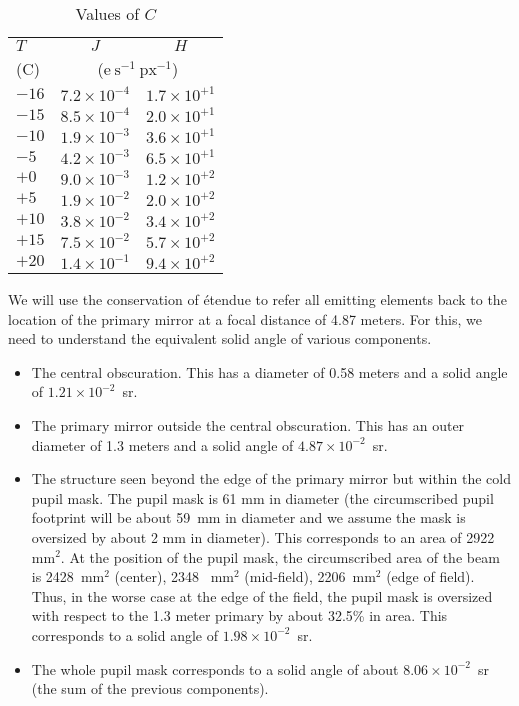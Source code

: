 \documentclass{article}
\begin{document}
\begin{table}
\caption{Values of $C$}
\label{table:C}
\medskip
\begin{center}
\begin{tabular}{lll}
\hline
\hline
$T$&\multicolumn{1}{c}{$J$}&\multicolumn{1}{c}{$H$}
\\
(C)&\multicolumn{2}{c}{($\mathrm{e}~\mathrm{s}^{-1}~\mathrm{px}^{-1}$)}
\\
\hline
\phantom{}$-16$&$7.2 \times 10^{-4}$&$1.7 \times 10^{+1}$\\
\phantom{}$-15$&$8.5 \times 10^{-4}$&$2.0 \times 10^{+1}$\\
\phantom{}$-10$&$1.9 \times 10^{-3}$&$3.6 \times 10^{+1}$\\
\phantom{0}$-5$&$4.2 \times 10^{-3}$&$6.5 \times 10^{+1}$\\
\phantom{0}$+0$&$9.0 \times 10^{-3}$&$1.2 \times 10^{+2}$\\
\phantom{0}$+5$&$1.9 \times 10^{-2}$&$2.0 \times 10^{+2}$\\
\phantom{}$+10$&$3.8 \times 10^{-2}$&$3.4 \times 10^{+2}$\\
\phantom{}$+15$&$7.5 \times 10^{-2}$&$5.7 \times 10^{+2}$\\
\phantom{}$+20$&$1.4 \times 10^{-1}$&$9.4 \times 10^{+2}$\\
\hline
\end{tabular}
\end{center}
\end{table}

We will use the conservation of étendue to refer all emitting elements back to the location of the primary mirror at a focal distance of 4.87 meters. For this, we need to understand the equivalent solid angle of various components.

\begin{itemize}
\item
The central obscuration. This has a diameter of 0.58 meters and a solid angle of $1.21 \times 10^{-2}$~sr.
\item
The primary mirror outside the central obscuration. This has an outer diameter of 1.3 meters and a solid angle of $4.87 \times 10^{-2}$~sr.
\item
The structure seen beyond the edge of the primary mirror but within the cold pupil mask. The pupil mask is 61 mm in diameter (the circumscribed pupil footprint will be about 59~mm in diameter and we assume the mask is oversized by about 2 mm in diameter). This corresponds to an area of 2922~$\mathrm{mm^2}$. At the position of the pupil mask, the circumscribed area of the beam is 2428~$\mathrm{mm^2}$ (center), 2348 ~$\mathrm{mm^2}$ (mid-field), 2206~$\mathrm{mm^2}$ (edge of field). Thus, in the worse case at the edge of the field, the pupil mask is oversized with respect to the 1.3 meter primary by about 32.5\% in area. This corresponds to a solid angle of $1.98 \times 10^{-2}$~sr.
\item
The whole pupil mask corresponds to a solid angle of about $8.06 \times 10^{-2}$~sr (the sum of the previous components).
\end{itemize}
\end{document}
